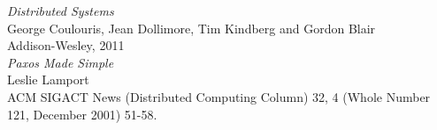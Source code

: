 \documentclass[10pt, oneside]{article}
\begin{document}
\begin{thebibliography}{9}

 \emph{Distributed Systems}\\
\newblock George Coulouris, Jean Dollimore, Tim Kindberg and Gordon Blair\\
\newblock Addison-Wesley, 2011\\

 \emph{Paxos Made Simple}\\
\newblock Leslie Lamport\\
\newblock ACM SIGACT News (Distributed Computing Column) 32, 4 (Whole Number
121, December 2001) 51-58.\\

\end{thebibliography}
\end{document}

